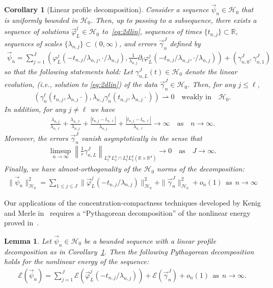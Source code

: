 \documentclass[10pt,reqno]{amsart}
\newcommand{\E}{\mathcal{E}}
\newcommand{\HH}{\mathcal{H}}
\newcommand{\R}{\mathbb{R}}
\newcommand{\ga}{\gamma}
\newcommand{\fy}{\varphi}
\newcommand{\la}{\lambda}
\newcommand{\p}{\partial}
\newcommand{\abs}[1]{\left\lvert{#1}\right\rvert}
\newcommand{\EQ}[1]{\begin{equation}\begin{split} #1 \end{split}\end{equation}}
\numberwithin{equation}{section}
\newtheorem{cor}[thm]{Corollary}
\newtheorem{lem}[thm]{Lemma}
\theoremstyle{remark}
\newcommand{\mas}{{\ \ \text{as} \ \ }}
\newcommand{\0}{\emptyset}
\begin{document}
\begin{cor}[Linear profile decomposition]\label{c:bg} Consider a sequence $\vec \psi_n \in \HH_0$ that is uniformly bounded in $\HH_0$. Then, up to passing to a subsequence,  there exists a sequence of solutions $\vec \fy^j_L \in \HH_0$ to~\eqref{eq:2dlin},  sequences of times $\{t_{n, j}\}\subset \R$,  sequences of scales $\{\la_{n, j}\}\subset (0, \infty)$, and errors $\vec \ga_n^J$ defined by 
\EQ{
\vec \psi_n = \sum_{j=1}^J (\fy^j_L( -t_{n, j}/ \la_{n, j}, \cdot/ \la_{n, j}), \frac{1}{\la_{n, j}}\p_t\fy^j_L( -t_{n, j}/ \la_{n, j}, \cdot/ \la_{n, j})) + (\ga_{n, 0}^J, \ga_{n, 1}^J)
}
so that the following statements hold: Let $\ga_{n, L}^J(t) \in \HH_0$ denote the linear evolution, (i.e., solution to \eqref{eq:2dlin}) of the data $\vec \ga_n^J \in \HH_0$. Then,  for any $j \le \ell$, 
\EQ{ \label{eq:ga-weak} 
(\ga_n^\ell(  t_{n, j},  \la_{n, j}\cdot) , \la_{n, j} \ga_n^\ell(  t_{n, j},  \la_{n, j}\cdot)) \rightharpoonup 0\quad \textrm{weakly in} \quad \HH_0. 
}
In addition, for any $j\neq \ell$ we have
\EQ{ \label{eq:po}
\frac{\la_{n, j}}{\la_{n, \ell}} + \frac{\la_{n, \ell}}{\la_{n, j}} + \frac{\abs{t_{n, j}-t_{n, \ell}}}{\la_{n, j}} + \frac{\abs{t_{n, j}-t_{n, \ell}}}{\la_{n, \ell}} \to \infty \quad \textrm{as} \quad n \to \infty.
}
Moreover, the errors $\vec \ga_n^J$ vanish asymptotically in the sense that  
\EQ{
\limsup_{n \to \infty} \left\|\frac{1}{r} \ga_{n, L}^J\right\|_{L^{\infty}_tL^4_x \cap L^3_tL^6_x( \R \times \R^4)}  \to 0 \quad \textrm{as} \quad J \to \infty.
}
Finally, we have almost-orthogonality of the $\HH_0$ norms of the decomposition: 
\EQ{ \label{ort H} 
\|\vec \psi_n\|_{\HH_0}^2 = \sum_{1 \le j \le J} \| \vec \fy_L^j( - t_{n, j}/ \la_{n, j}) \|_{\HH_0}^2  +  \|\vec \ga_n^J\|_{\HH_0}^2 + o_n(1) \mas n \to \infty
} 
\end{cor}
Our applications of the concentration-compactness techniques developed by Kenig and Merle in~\cite{KM06, KM08} requires a ``Pythagorean decomposition'' of the nonlinear energy proved in~\cite{CKLS1}. 
\begin{lem}\emph{\cite[Lemma $2.16$]{CKLS1} }\label{l:enorth}
Let  $\vec \psi_n \in \HH_0$ be a bounded sequence with a linear profile decomposition as in Corollary~\ref{c:bg}. Then the following Pythagorean decomposition holds for the nonlinear energy of the sequence: 
\EQ{\label{eq:enorth} 
\E(\vec \psi_n) = \sum_{j=1}^J \E(\vec \fy_L^j(-t_{n, j}/ \la_{n, j})) + \E(\vec \ga_n^J) + o_n(1)  \mas n \to \infty.
} 
 \end{lem}
\end{document}
